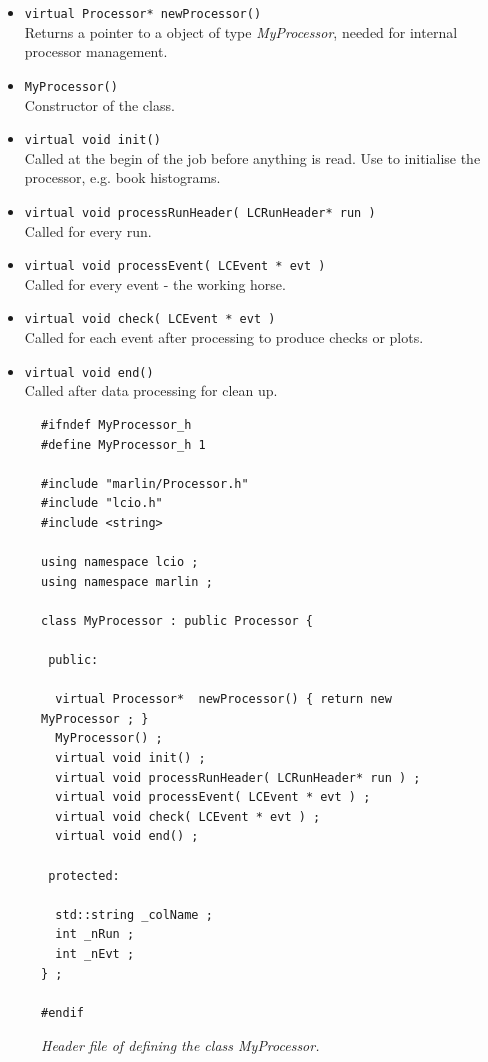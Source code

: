 \begin{itemize}
\item {\tt virtual Processor*  newProcessor()} \\
      Returns a pointer to a object of type {\em MyProcessor},
      needed for internal processor management.
\item {\tt MyProcessor()} \\
      Constructor of the class.
\item {\tt virtual void init()} \\
      Called at the begin of the job before anything is read.
      Use to initialise the processor, e.g. book histograms.
\item {\tt virtual void processRunHeader( LCRunHeader* run )} \\
      Called for every run.
\item {\tt virtual void processEvent( LCEvent * evt )} \\
      Called for every event - the working horse.
\item {\tt virtual void check( LCEvent * evt )} \\
      Called for each event after processing to produce checks or plots. 
\item {\tt virtual void end()} \\
      Called after data processing for clean up.
\end{itemize}

\begin{figure}
\begin{verbatim}
#ifndef MyProcessor_h
#define MyProcessor_h 1

#include "marlin/Processor.h"
#include "lcio.h"
#include <string>

using namespace lcio ;
using namespace marlin ;

class MyProcessor : public Processor {
  
 public:
  
  virtual Processor*  newProcessor() { return new MyProcessor ; }
  MyProcessor() ;
  virtual void init() ;
  virtual void processRunHeader( LCRunHeader* run ) ;
  virtual void processEvent( LCEvent * evt ) ; 
  virtual void check( LCEvent * evt ) ; 
  virtual void end() ;
  
 protected:

  std::string _colName ;
  int _nRun ;
  int _nEvt ;
} ;

#endif
\end{verbatim}
\caption{\label{fig:myprocessor_h}
\em Header file of defining the class {\em MyProcessor}.
}
\end{figure}

